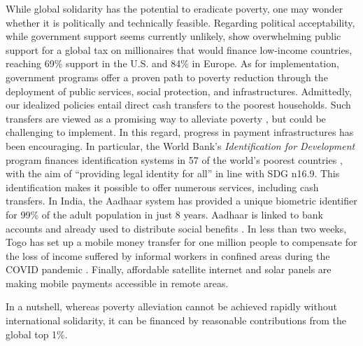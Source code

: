 While global solidarity has the potential to eradicate poverty, one may wonder whether it is politically and technically feasible. 
Regarding political acceptability, while government support seems currently unlikely, \cite{fabre_international_2023} show overwhelming public support for a global tax on millionaires that would finance low-income countries, reaching 69\% support in the U.S. and 84\% in Europe. %
As for implementation, government programs offer a proven path to poverty reduction through the deployment of public services, social protection, and infrastructures. 
Admittedly, our idealized policies entail direct cash transfers to the poorest households. Such transfers are viewed as a promising way to alleviate poverty \citep{haushofer_short-term_2016,egger_general_2022}, but could be challenging to implement. In this regard, progress in payment infrastructures has been encouraging. In particular, the World Bank's \textit{Identification for Development} program finances identification systems in 57 of the world's poorest countries \citep{world_bank_state_2017,world_bank_benin_2020,world_bank_identification_2022}, with the aim of ``providing legal identity for all'' in line with SDG n\textdegree{}16.9. This identification makes it possible to offer numerous services, including cash transfers. In India, the Aadhaar system has provided a unique biometric identifier for 99\% of the adult population in just 8 years. Aadhaar is linked to bank accounts and already used to distribute social benefits \citep{muralidharan_identity_2023}. In less than two weeks, Togo has set up a mobile money transfer for one million people to compensate for the loss of income suffered by informal workers in confined areas during the COVID pandemic \citep{ipa_togos_2021}. Finally, affordable satellite internet and solar panels are making mobile payments accessible in remote areas. %

In a nutshell, whereas poverty alleviation cannot be achieved rapidly without international solidarity, it can be financed by reasonable contributions from the global top 1\%.

